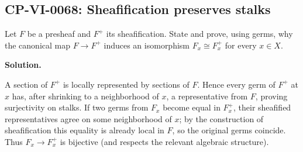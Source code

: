 
\subsection*{CP-VI-0068: Sheafification preserves stalks}

Let $F$ be a presheaf and $F^+$ its sheafification. State and prove, using germs, why the canonical map $F\to F^+$ induces an isomorphism $F_x\cong F^+_x$ for every $x\in X$.

\medskip
\noindent\textbf{Solution.}

A section of $F^+$ is locally represented by sections of $F$. Hence every germ of $F^+$ at $x$ has, after shrinking to a neighborhood of $x$, a representative from $F$, proving surjectivity on stalks. If two germs from $F_x$ become equal in $F^+_x$, their sheafified representatives agree on some neighborhood of $x$; by the construction of sheafification this equality is already local in $F$, so the original germs coincide. Thus $F_x\to F^+_x$ is bijective (and respects the relevant algebraic structure).
